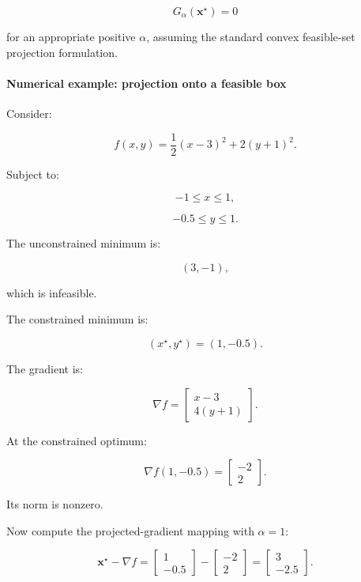 \[
\boxed{ G_\alpha(\mathbf x^\star)=0 }
\]

for an appropriate positive \(\alpha\), assuming the standard convex feasible-set projection formulation.

\paragraph{Numerical example: projection onto a feasible box}\label{02-foundations-ii-ch027-numerical-example-projection-onto-a-feasible-box}

\hypertarget{02-foundations-ii-ch027-numerical-example-projection-onto-a-feasible-box}{}

Consider:

\[
f(x,y)= \frac12(x-3)^2+2(y+1)^2.
\]

Subject to:

\[
-1\le x\le1,
\]

\[
-0.5\le y\le1.
\]

The unconstrained minimum is:

\[
(3,-1),
\]

which is infeasible.

The constrained minimum is:

\[
\boxed{ (x^\star,y^\star)=(1,-0.5) }.
\]

The gradient is:

\[
\nabla f= \begin{bmatrix} x-3\\ 4(y+1) \end{bmatrix}.
\]

At the constrained optimum:

\[
\nabla f(1,-0.5)= \begin{bmatrix} -2\\2 \end{bmatrix}.
\]

Its norm is nonzero.

Now compute the projected-gradient mapping with \(\alpha=1\):

\[
\mathbf x^\star-\nabla f= \begin{bmatrix} 1\\-0.5 \end{bmatrix} - \begin{bmatrix} -2\\2 \end{bmatrix} = \begin{bmatrix} 3\\-2.5 \end{bmatrix}.
\]

